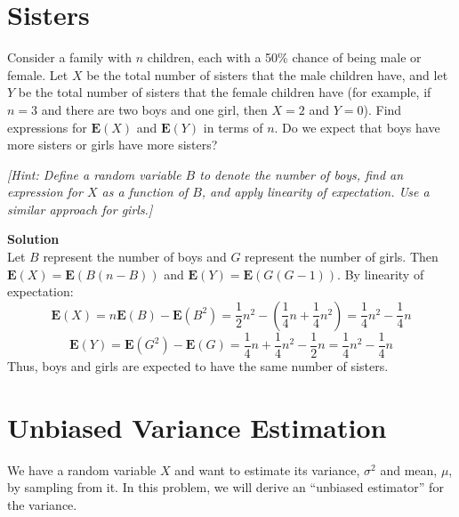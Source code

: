 \documentclass[11pt]{article}
\newcommand*{\Question}[1]{\section{#1}}
\newenvironment{Answer}{\vspace{10pt}\begin{mdframed}\textbf{Solution}\\}{\end{mdframed}\vfill\pagebreak[3]}
\newenvironment{Answer}{\vspace{10pt}}{\vfill\pagebreak[3]}
\newcommand*{\E}{\textbf{E}}
\begin{document}
\Question{Sisters}

Consider a family with $n$ children, each with a 50\% chance of being male or female. Let $X$ be the total number of sisters that the male children have, and let $Y$ be the total number of sisters that the female children have (for example, if $n = 3$ and there are two boys and one girl, then $X = 2$ and $Y = 0$). Find expressions for $\E(X)$ and $\E(Y)$ in terms of $n$. Do we expect that boys have more sisters or girls have more sisters?

\textit{[Hint: Define a random variable $B$ to denote the number of boys, find an expression for $X$ as a function of $B$, and apply linearity of expectation. Use a similar approach for girls.]}

\begin{Answer}
Let $B$ represent the number of boys and $G$ represent the number of girls. Then $\E(X)=\E(B(n-B))$ and $\E(Y)=\E(G(G-1))$. By linearity of expectation:
$$\E(X)=n\E(B)-\E(B^2)=\frac{1}{2}n^2-(\frac{1}{4}n+\frac{1}{4}n^2)=\frac{1}{4}n^2-\frac{1}{4}n$$
$$\E(Y)=\E(G^2)-\E(G)=\frac{1}{4}n+\frac{1}{4}n^2-\frac{1}{2}n=\frac{1}{4}n^2-\frac{1}{4}n$$
Thus, boys and girls are expected to have the same number of sisters.
\end{Answer}

\Question{Unbiased Variance Estimation}

We have a random variable $X$ and want to estimate its variance,
$\sigma^2$ and mean, $\mu$, by sampling from it.  In this problem, we
will derive an ``unbiased estimator'' for the variance.
\end{document}
